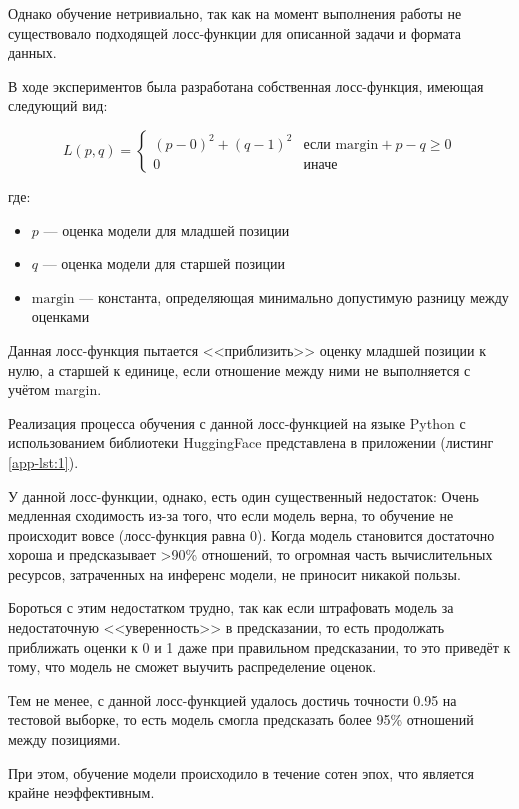 \documentclass[14pt]{mmcs_article}
\begin{document}
Однако обучение нетривиально, так как на момент выполнения работы не существовало подходящей лосс-функции для описанной задачи и формата данных.

В ходе экспериментов была разработана собственная лосс-функция, имеющая следующий вид:

\begin{equation}
  \label{eq:custom_loss_function}
  L(p, q) = \begin{cases}
    (p - 0)^2 + (q - 1)^2 & \text{если } \text{margin} + p - q \geq 0 \\
    0                     & \text{иначе}
  \end{cases}
\end{equation}

где:
\begin{itemize}
  \item $p$ --- оценка модели для младшей позиции
  \item $q$ --- оценка модели для старшей позиции
  \item $\text{margin}$ --- константа, определяющая минимально допустимую разницу между оценками
\end{itemize}

Данная лосс-функция пытается <<приблизить>> оценку младшей позиции к нулю, а старшей к единице, если отношение между ними не выполняется с учётом margin.

Реализация процесса обучения с данной лосс-функцией на языке Python с использованием библиотеки HuggingFace представлена в приложении (листинг \ref{app-lst:1}).

У данной лосс-функции, однако, есть один существенный недостаток: Очень медленная сходимость из-за того, что если модель верна, то обучение не происходит вовсе (лосс-функция равна 0). Когда модель становится достаточно хороша и предсказывает >90\% отношений, то огромная часть вычислительных ресурсов, затраченных на инференс модели, не приносит никакой пользы.

Бороться с этим недостатком трудно, так как если штрафовать модель за недостаточную <<уверенность>> в предсказании, то есть продолжать приближать оценки к 0 и 1 даже при правильном предсказании, то это приведёт к тому, что модель не сможет выучить распределение оценок.

Тем не менее, с данной лосс-функцией удалось достичь точности 0.95 на тестовой выборке, то есть модель смогла предсказать более 95\% отношений между позициями.

При этом, обучение модели происходило в течение сотен эпох, что является крайне неэффективным.
\end{document}
